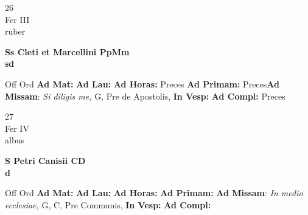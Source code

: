 \documentclass[10pt, openany]{book}
\begin{document}
    \begin{center}
        \begin{minipage}{3.5in}
            \vspace{2em}
            \begin{minipage}{0.5in}
                {\Huge 26} \\
                {\normalsize Fer III} \\
                {\normalsize ruber}
            \end{minipage}
            \begin{minipage}{3.0in}
                \textbf{ \large Ss Cleti et Marcellini PpMm \\
                \textnormal{\normalsize sd}} \\ 
            \end{minipage}
            \begin{justify}Off Ord
                \textbf{Ad Mat: }
                \textbf{Ad Lau: }
                \textbf{Ad Horas: }Preces
                \textbf{Ad Primam: }Preces\textbf{Ad Missam}: \textit{Si diligis me,} G, Pre de Apostolis,  
                \textbf{In Vesp: }
                \textbf{Ad Compl: }Preces
            \end{justify}
        \end{minipage}
    \end{center}

    \begin{center}
        \begin{minipage}{3.5in}
            \vspace{2em}
            \begin{minipage}{0.5in}
                {\Huge 27} \\
                {\normalsize Fer IV} \\
                {\normalsize albus}
            \end{minipage}
            \begin{minipage}{3.0in}
                \textbf{ \large S Petri Canisii CD \\
                \textnormal{\normalsize d}} \\ 
            \end{minipage}
            \begin{justify}Off Ord
                \textbf{Ad Mat: }
                \textbf{Ad Lau: }
                \textbf{Ad Horas: }
                \textbf{Ad Primam: }\textbf{Ad Missam}: \textit{In medio ecclesiae,} G, C, Pre Communis,  
                \textbf{In Vesp: }
                \textbf{Ad Compl: }
            \end{justify}
        \end{minipage}
    \end{center}
\end{document}
